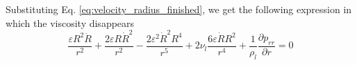 \documentclass{article}
\numberwithin{equation}{section}
\newcommand{\pd}[2]{\dfrac{\partial #1}{\partial #2}}
\newcommand{\pdd}[2]{\dfrac{\partial^2 #1}{\partial #2^2}}
\begin{document}
Substituting Eq. \eqref{eq:velocity_radius_finished}, we get the following expression in which the viscosity disappears
\begin{equation}
    \frac{\varepsilon R^2 \ddot{R}}{r^2}
    + \frac{2 \varepsilon R \dot{R}^2}{r^2}
    - \frac{2 \varepsilon^2 \dot{R}^2 R^4}{r^5}
    + 2\nu_l \frac{6 \varepsilon \dot{R} R^2}{r^4}
    + \frac{1}{\rho_l} \pd{p_{rr}}{r}
    = 0
\end{equation}
\end{document}
